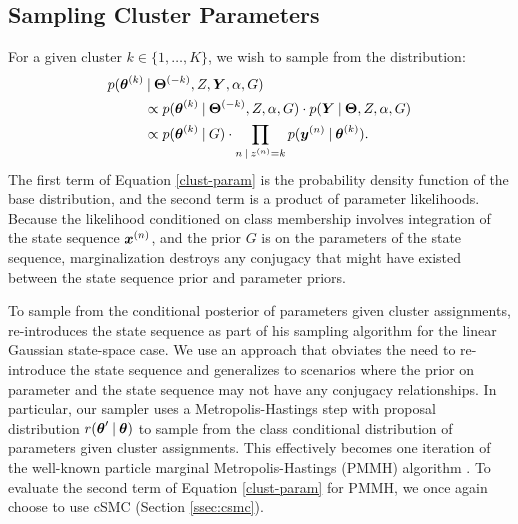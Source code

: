 \documentclass[twoside]{article}
\begin{document}
\subsection{Sampling Cluster Parameters}
For a given cluster $k \in \{1, \ldots, K\}$, we wish to sample from the distribution:
\begin{align}
p(\boldsymbol{\theta}^{(k)}_{} &\:\vert\: \boldsymbol{\Theta}^{(-k)}_{}, Z, \boldsymbol{Y}, \alpha, G) \label{clust-param} \\
&\propto p(\boldsymbol{\theta}^{(k)}_{} \:\vert\: \boldsymbol{\Theta}^{(-k)}_{}, Z, \alpha, G) \cdot p(\boldsymbol{Y} \:\vert\: \boldsymbol{\Theta}, Z, \alpha, G) \nonumber \\
&\propto p(\boldsymbol{\theta}^{(k)}_{}  \:\vert\: G) \cdot \prod_{n \:\vert\: {z}^{(n)}_{} = k} p(\boldsymbol{y}^{(n)}_{} \:\vert\: \boldsymbol{\theta}^{(k)}_{}). \nonumber
\end{align}
The first term of Equation \ref{clust-param} is the probability density function of the base distribution, and the second term is a product of parameter likelihoods. Because the likelihood conditioned on class membership involves integration of the state sequence $\boldsymbol{x}^{(n)}_{}$, and the prior $G$ is on the parameters of the state sequence, marginalization destroys any conjugacy that might have existed between the state sequence prior and parameter priors. 

To sample from the conditional posterior of parameters given cluster assignments, \cite{middleton2014} re-introduces the state sequence as part of his sampling algorithm for the linear Gaussian state-space case. %
We use an approach that obviates the need to re-introduce the state sequence and generalizes to scenarios where the prior on parameter and the state sequence may not have any conjugacy relationships. In particular, our sampler uses a Metropolis-Hastings step with proposal distribution $r(\boldsymbol{\theta}' \:\vert\: \boldsymbol{\theta})$ to sample from the class conditional distribution of parameters given cluster assignments. This effectively becomes one iteration of the well-known particle marginal Metropolis-Hastings (PMMH) algorithm \citep{andrieu2010particle}.  To evaluate the second term of Equation \ref{clust-param} for PMMH, we once again choose to use cSMC (Section \ref{ssec:csmc}).   
\end{document}
